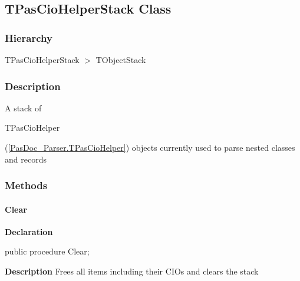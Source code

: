 \documentclass{report}
\newif\ifpdf
\begin{document}
\subsection*{TPasCioHelperStack Class}
\fi
\label{PasDoc_Parser.TPasCioHelperStack}
\subsubsection*{\large{\textbf{Hierarchy}}\normalsize\hspace{1ex}\hfill}
TPasCioHelperStack {$>$} TObjectStack
\subsubsection*{\large{\textbf{Description}}\normalsize\hspace{1ex}\hfill}
A stack of \begin{ttfamily}TPasCioHelper\end{ttfamily}(\ref{PasDoc_Parser.TPasCioHelper}) objects currently used to parse nested classes and records\subsubsection*{\large{\textbf{Methods}}\normalsize\hspace{1ex}\hfill}
\paragraph*{Clear}\hspace*{\fill}

\label{PasDoc_Parser.TPasCioHelperStack-Clear}
\begin{list}{}{
\setlength{\itemindent}{0cm}
\setlength{\listparindent}{0cm}
\setlength{\leftmargin}{\evensidemargin}
\addtolength{\leftmargin}{\tmplength}
\settowidth{\labelsep}{X}
\addtolength{\leftmargin}{\labelsep}
\setlength{\labelwidth}{\tmplength}
}
\item[\textbf{Declaration}\hfill]
\ifpdf
\begin{flushleft}
\fi
\begin{ttfamily}
public procedure Clear;\end{ttfamily}

\ifpdf
\end{flushleft}
\fi

\par
\item[\textbf{Description}]
Frees all items including their CIOs and clears the stack

\end{list}
\end{document}
